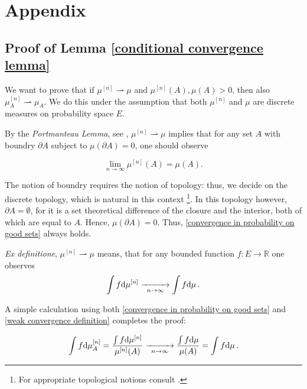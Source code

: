 \section*{Appendix}

\subsection*{Proof of Lemma \ref{conditional convergence lemma}}

We want to prove that if $\mu^{[n]} \rightharpoonup \mu$ and $\mu^{[n]}(A), \mu(A) > 0$, then also $\mu^{[n]}_A \rightharpoonup \mu_A$. We do this under the assumption that both $\mu^{[n]}$ and $\mu$ are discrete measures on probability space $E$. 

By the {\it Portmanteau Lemma}, see \cite{Kallenberg2002FoundationsOfModernProbability}, $\mu^{[n]} \rightharpoonup \mu$ implies that for any set $A$ with boundry $\partial A$ subject to $\mu( \partial A) = 0$, one should observe 

\begin{equation}\label{convergence in probability on good sets}
	\lim_{n \to \infty} \mu^{[n]}(A) = \mu(A).
\end{equation}


The notion of boundry requires the notion of topology: thus, we decide on the discrete topology, which is natural in this context \footnote{For appropriate topological notions consult \cite{Dugundji1966Topology}.}. In this topology however, $\partial A = \emptyset$, for it is a set theoretical difference of the closure and the interior, both of which are equal to $A$. Hence, $\mu( \partial A) = 0$. Thus, \eqref{convergence in probability on good sets} always holds.

{\it Ex definitione}, $\mu^{[n]} \rightharpoonup \mu$ means, that for any bounded function $f:E\to\mathbb{R}$ one observes
\begin{equation}\label{weak convergence definition}
	\int f \mathrm{d} \mu^{[n]} \underset{n \to \infty}{\xrightarrow{\hspace*{1cm}}} \int f \mathrm{d}\mu\,.
\end{equation}

A simple calculation using both \eqref{convergence in probability on good sets} and \eqref{weak convergence definition} completes the proof:

\begin{equation*}
	\int f \mathrm{d} \mu^{[n]}_A =  \frac{ \int f \mathrm{d} \mu^{[n]} }{ \mu^{[n]}(A) } \underset{n \to \infty}{\xrightarrow{\hspace*{1cm}}} \frac{ \int f \mathrm{d} \mu }{ \mu(A) } = \int f \mathrm{d} \mu\,.
\end{equation*}